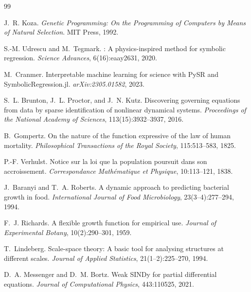 \documentclass[11pt,a4paper]{article}
\begin{document}

\begin{thebibliography}{99}

J.~R. Koza.
\newblock \emph{Genetic Programming: On the Programming of Computers by Means of Natural Selection}.
\newblock MIT Press, 1992.

S.-M. Udrescu and M.~Tegmark.
: A physics-inspired method for symbolic regression.
\newblock \emph{Science Advances}, 6(16):eaay2631, 2020.

M.~Cranmer.
\newblock Interpretable machine learning for science with {PySR} and {SymbolicRegression.jl}.
\newblock \emph{arXiv:2305.01582}, 2023.

S.~L. Brunton, J.~L. Proctor, and J.~N. Kutz.
\newblock Discovering governing equations from data by sparse identification of nonlinear
  dynamical systems.
\newblock \emph{Proceedings of the National Academy of Sciences}, 113(15):3932--3937, 2016.

B.~Gompertz.
\newblock On the nature of the function expressive of the law of human mortality.
\newblock \emph{Philosophical Transactions of the Royal Society}, 115:513--583, 1825.

P.-F. Verhulst.
\newblock Notice sur la loi que la population poursuit dans son accroissement.
\newblock \emph{Correspondance Math\'ematique et Physique}, 10:113--121, 1838.

J.~Baranyi and T.~A. Roberts.
\newblock A dynamic approach to predicting bacterial growth in food.
\newblock \emph{International Journal of Food Microbiology}, 23(3--4):277--294, 1994.

F.~J. Richards.
\newblock A flexible growth function for empirical use.
\newblock \emph{Journal of Experimental Botany}, 10(2):290--301, 1959.

T.~Lindeberg.
\newblock Scale-space theory: A basic tool for analysing structures at different scales.
\newblock \emph{Journal of Applied Statistics}, 21(1--2):225--270, 1994.

D.~A. Messenger and D.~M. Bortz.
\newblock Weak {SINDy} for partial differential equations.
\newblock \emph{Journal of Computational Physics}, 443:110525, 2021.

\end{thebibliography}
\end{document}
